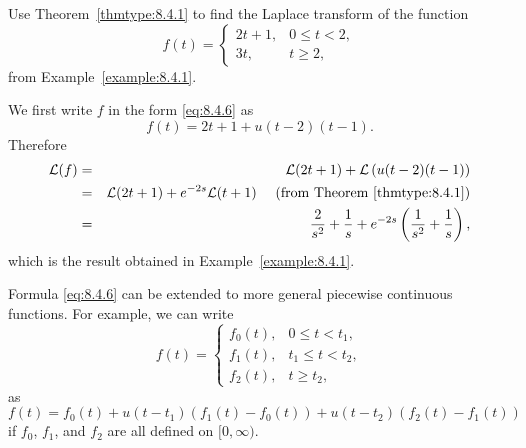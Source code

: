 \documentclass{ximera}
\begin{document}
\begin{example}\label{example:8.4.3}
Use Theorem~\ref{thmtype:8.4.1} to find the Laplace transform of the
function
$$
f(t)=\left\{\begin{array}{cl} 2t+1,&0\leq t<2,\\ 3t,&t\geq 2,
\end{array}\right.
$$
from Example~\ref{example:8.4.1}.


\begin{explanation}
We first write $f$ in the form \eqref{eq:8.4.6} as
$$
f(t)=2t+1+u(t-2)(t-1).
$$
Therefore
\begin{eqnarray*}
{\cal L}(f)&=&{\cal L}(2t+1) +{\cal L}\left(u(t-2)(t-1)\right)\\
&=&{\cal L}(2t+1) +e^{-2s}{\cal L}(t+1)\quad\mbox{ (from
Theorem~\ref{thmtype:8.4.1}})\\
&=&\frac{2}{s^2}+\frac{1}{s}+e^{-2s}\left(\frac{1}{s^2}+\frac{1}{s}\right),
\end{eqnarray*}
which is the result obtained in Example~\ref{example:8.4.1}.

Formula \eqref{eq:8.4.6} can be extended to more general piecewise continuous
functions. For example, we can write
$$
f(t)=\left\{\begin{array}{rl}
f_0(t),&0\leq t<t_1,\\
f_1(t),&t_1\leq t<t_2,\\
f_2(t),&t\geq t_2,
\end{array}\right.
$$
as
$$
f(t)=f_0(t)+u(t-t_1)\left(f_1(t)-f_0(t)\right)+
u(t-t_2)\left(f_2(t)-f_1(t)\right)
$$
if $f_0$, $f_1$, and $f_2$ are all defined on $[0,\infty)$.
\end{explanation}
\end{example}
\end{document}
